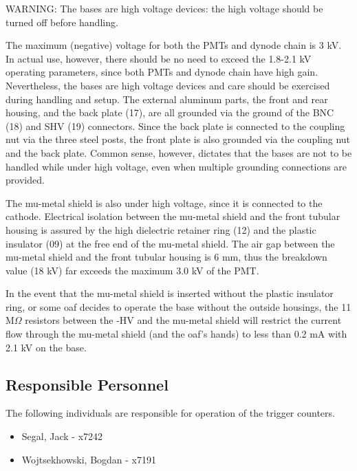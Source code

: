\begin{safetyen}{10}{10}
  WARNING: The bases are high voltage devices: the high voltage should be
  turned off before handling.
  
  The maximum (negative) voltage for both the PMTs and dynode chain is 3 kV. In actual 
  use, however, there should be no need to exceed the 1.8-2.1 kV operating 
  parameters, since both PMTs and dynode chain have high gain. Nevertheless, the 
  bases are high voltage devices and care should be exercised during handling and 
  setup. The external aluminum parts, the front and rear housing, and the back 
  plate (17), are all grounded via the ground of the BNC (18) and SHV (19) 
  connectors. Since the back plate is connected to the coupling nut via the three 
  steel posts, the front plate is also grounded via the coupling nut and the back 
  plate. Common sense, however, dictates that the bases are not to be handled     
  while under high voltage, even when multiple grounding connections are provided.
  
  The mu-metal shield is also under high voltage, since it is connected to the 
  cathode. Electrical isolation between the mu-metal shield and the front 
  tubular housing is assured by the high dielectric retainer ring (12) and the 
  plastic insulator (09) at the free end of the mu-metal shield. The air gap 
  between the mu-metal shield and the front tubular housing is 6 mm, thus the 
  breakdown value (18 kV) far exceeds the maximum 3.0 kV of the PMT.
  
  In the event that the mu-metal shield is inserted without the plastic insulator 
  ring, or some oaf decides to operate the base without the outside housings, the 
  11 M$\Omega$ resistors between the -HV and the mu-metal shield will restrict the 
  current flow through the mu-metal shield (and the oaf's hands) to less than 0.2 
  mA with 2.1 kV on the base. 
\end{safetyen}

\subsection{Responsible Personnel} 
The following individuals are responsible for operation of the trigger counters. 
\begin{itemize}
\item[~]Segal, Jack - x7242 
\item[~]Wojtsekhowski, Bogdan - x7191 
\end{itemize} 

